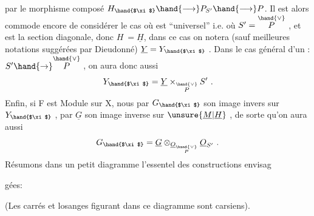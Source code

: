 
par le morphisme composé $H_{\hand{$\xi$}} \hand{\longrightarrow} P_{S'} \hand{\longrightarrow} P$. Il est alors commode
 encore de considérer le cas où \hand{$\xi$} est
``universel'' i.e. où $S' = \overset{\hand{\vee}}{P}$ , et \hand{$\xi$} est la section diagonale, donc $H \ = \underline{H}$,
dans ce cas on notera (sauf meilleures notations suggérées par Dieudonné)
$\underline{Y} = Y_{\hand{$\xi$}}$ . Dans le cas général d'un \hand{$\xi$}: $S' \hand{\to} \overset{\hand{\vee}}{P}$ , on aura donc aussi
\[ Y_{\hand{$\xi$}} = \underline{Y} \times_{\overset{\hand{\vee}}{P}} S' \ . \]
Enfin, si F est Module sur X, nous  par $G_{\hand{$\xi$}}$ son image invers
sur $Y_{\hand{$\xi$}}$ , par $\underline{G}$ son image inverse sur $\unsure{\underline{M}|\underline{H}}$ , de sorte qu'on aura aussi
\[ G_{\hand{$\xi$}} = \underline{G} \otimes_{\underline{O}_{\overset{\hand{\vee}}{P}}} \underline{O}_{S'} \ . \]
Résumons dans un petit diagramme l'essentel des constructions  envisag

gées:

(Les carrés et losanges figurant dans ce diagramme sont carsiens).

